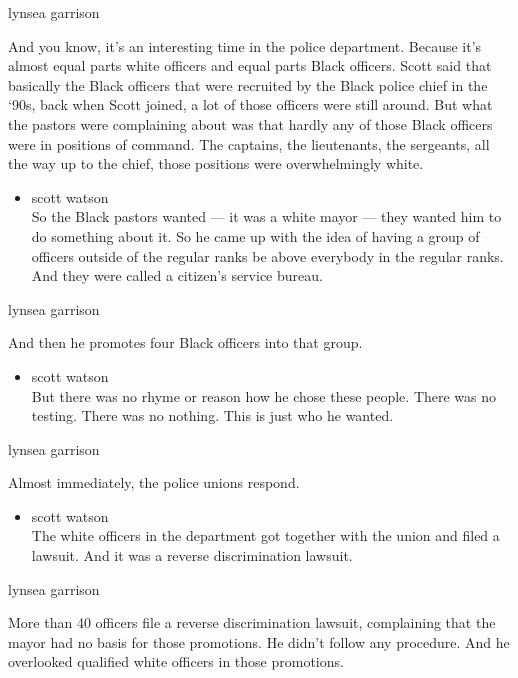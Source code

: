 lynsea garrison

And you know, it's an interesting time in the police department. Because
it's almost equal parts white officers and equal parts Black officers.
Scott said that basically the Black officers that were recruited by the
Black police chief in the `90s, back when Scott joined, a lot of those
officers were still around. But what the pastors were complaining about
was that hardly any of those Black officers were in positions of
command. The captains, the lieutenants, the sergeants, all the way up to
the chief, those positions were overwhelmingly white.

\begin{itemize}
\tightlist
\item
  scott watson\\
  So the Black pastors wanted --- it was a white mayor --- they wanted
  him to do something about it. So he came up with the idea of having a
  group of officers outside of the regular ranks be above everybody in
  the regular ranks. And they were called a citizen's service bureau.
\end{itemize}

lynsea garrison

And then he promotes four Black officers into that group.

\begin{itemize}
\tightlist
\item
  scott watson\\
  But there was no rhyme or reason how he chose these people. There was
  no testing. There was no nothing. This is just who he wanted.
\end{itemize}

lynsea garrison

Almost immediately, the police unions respond.

\begin{itemize}
\tightlist
\item
  scott watson\\
  The white officers in the department got together with the union and
  filed a lawsuit. And it was a reverse discrimination lawsuit.
\end{itemize}

lynsea garrison

More than 40 officers file a reverse discrimination lawsuit, complaining
that the mayor had no basis for those promotions. He didn't follow any
procedure. And he overlooked qualified white officers in those
promotions.

